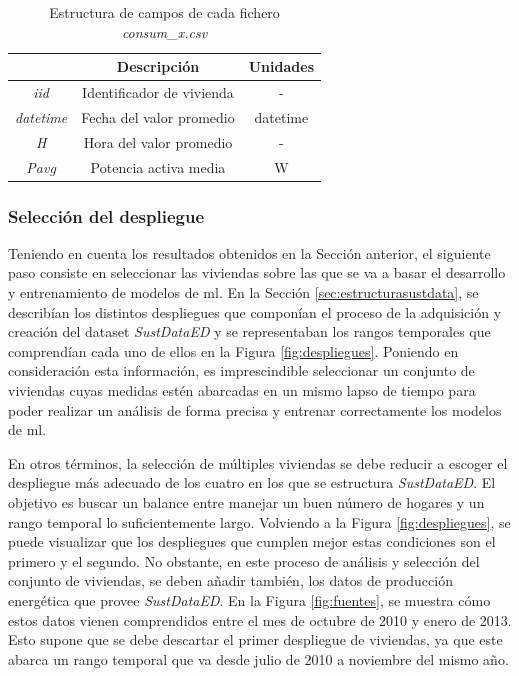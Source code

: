 \vspace{3mm}

\begin{table}[h!]
  \centering
  \begin{tabular}{|c|c|c|}
  \hline
  \rowcolor[HTML]{AAAAAA} 
  \multicolumn{1}{|c|}{\cellcolor[HTML]{AAAAAA}Campo} & \multicolumn{1}{c|}{\cellcolor[HTML]{AAAAAA}Descripción} & Unidades \\ \hline
  \textit{iid} & Identificador de vivienda & - \\ \hline
  \textit{datetime} & Fecha del valor promedio & datetime \\ \hline
  \textit{H} & Hora del valor promedio & - \\ \hline
  \textit{Pavg} & Potencia activa media & W \\ \hline
  \end{tabular}
  \caption{Estructura de campos de cada fichero \textit{consum\_x.csv}}
  \label{tab:consum}
\end{table}

\subsubsection{Selección del despliegue}

Teniendo en cuenta los resultados obtenidos en la Sección anterior, el siguiente paso consiste en seleccionar las viviendas sobre las que se va a basar el desarrollo y entrenamiento de modelos de \gls{ml}. En la Sección \ref{sec:estructurasustdata}, se describían los distintos despliegues que componían el proceso de la adquisición y creación del dataset \textit{SustDataED} y se representaban los rangos temporales que comprendían cada uno de ellos en la Figura \ref{fig:despliegues}. Poniendo en consideración esta información, es imprescindible seleccionar un conjunto de viviendas cuyas medidas estén abarcadas en un mismo lapso de tiempo para poder realizar un análisis de forma precisa y entrenar correctamente los modelos de \gls{ml}. 

\vspace{3mm}

En otros términos, la selección de múltiples viviendas se debe reducir a escoger el despliegue más adecuado de los cuatro en los que se estructura \textit{SustDataED}. El objetivo es buscar un balance entre manejar un buen número de hogares y un rango temporal lo suficientemente largo. Volviendo a la Figura \ref{fig:despliegues}, se puede visualizar que los despliegues que cumplen mejor estas condiciones son el primero y el segundo. No obstante, en este proceso de análisis y selección del conjunto de viviendas, se deben añadir también, los datos de producción energética que provee \textit{SustDataED}. En la Figura \ref{fig:fuentes}, se muestra cómo estos datos vienen comprendidos entre el mes de octubre de 2010 y enero de 2013. Esto supone que se debe descartar el primer despliegue de viviendas, ya que este abarca un rango temporal que va desde julio de 2010 a noviembre del mismo año.

